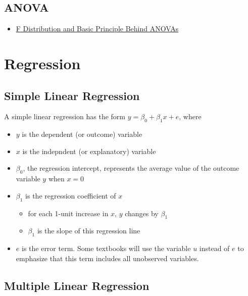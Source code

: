 \documentclass[]{book}
\providecommand{\tightlist}{%
  \setlength{\itemsep}{0pt}\setlength{\parskip}{0pt}}
\begin{document}
\hypertarget{anova}{%
\subsection{ANOVA}\label{anova}}

\begin{itemize}
\tightlist
\item
  \href{http://www.bodowinter.com/tutorial/bw_anova_general.pdf}{F Distribution and Basic Principle Behind ANOVAs}
\end{itemize}

\hypertarget{regression-1}{%
\section{Regression}\label{regression-1}}

\hypertarget{simple-linear-regression}{%
\subsection{Simple Linear Regression}\label{simple-linear-regression}}

A simple linear regression has the form \(y=\beta_0 + \beta_1 x + e\), where

\begin{itemize}
\tightlist
\item
  \(y\) is the dependent (or outcome) variable
\item
  \(x\) is the indepndent (or explanatory) variable
\item
  \(\beta_0\), the regression intercept, represents the average value of the outcome variable \(y\) when \(x=0\)
\item
  \(\beta_1\) is the regression coefficient of \(x\)

  \begin{itemize}
  \tightlist
  \item
    for each 1-unit increase in \(x\), \(y\) changes by \(\beta_1\)
  \item
    \(\beta_1\) is the slope of this regression line
  \end{itemize}
\item
  \(e\) is the error term. Some textbooks will use the variable \(u\) instead of \(e\) to emphasize that this term includes all unobserved variables.
\end{itemize}

\hypertarget{multiple-linear-regression}{%
\subsection{Multiple Linear Regression}\label{multiple-linear-regression}}
\end{document}
